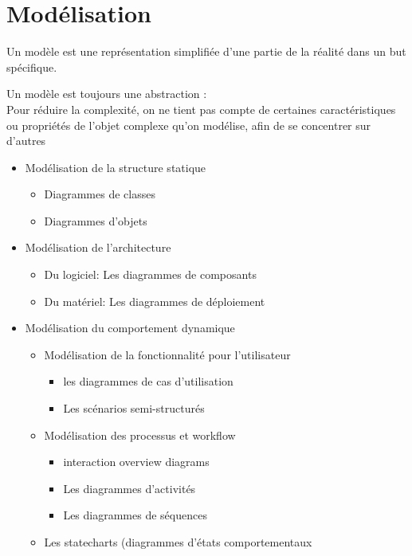 \section{Modélisation}
\begin{definition}[Modèle]
    Un modèle est une représentation simplifiée d’une partie de la réalité dans un but spécifique.
\end{definition}
 Un modèle est toujours une abstraction : \\ Pour réduire la complexité, on ne tient pas compte de certaines caractéristiques ou propriétés de l’objet complexe qu’on modélise, afin de se concentrer sur d’autres
\begin{itemize}
\item Modélisation de la structure statique
\begin{itemize}
    \item Diagrammes de classes
    \item Diagrammes d'objets
\end{itemize}
\item Modélisation de l’architecture
\begin{itemize}
    \item Du logiciel: Les diagrammes de composants
    \item Du matériel: Les diagrammes de déploiement
\end{itemize}
\item Modélisation du comportement dynamique
\begin{itemize}
    \item Modélisation de la fonctionnalité pour l'utilisateur
    \begin{itemize}
        \item les diagrammes de cas d'utilisation
        \item Les scénarios semi-structurés
    \end{itemize}
    \item Modélisation des processus et workflow
    \begin{itemize}
        \item interaction overview diagrams
        \item Les diagrammes d'activités
        \item Les diagrammes de séquences
    \end{itemize}
    \item Les statecharts (diagrammes d'états comportementaux
\end{itemize}

\end{itemize}


